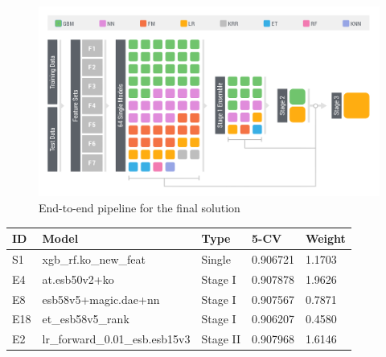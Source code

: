 \begin{figure}[!ht]
  \caption{End-to-end pipeline for the final solution}
  \centering
    \includegraphics[width=1 \textwidth]{ensemble}
\end{figure}

\begin{center}
\begin{tabular}{lllll}
\label{tb:finalEnsemble}
ID 	& Model 				& Type 	& 5-CV 		& Weight\\ \hline
S1 	& xgb\_rf.ko\_new\_feat 	& Single 	& 0.906721 	& 1.1703 \\
E4 	& at.esb50v2+ko 		& Stage I 	& 0.907878 	& 1.9626\\
E8 	& esb58v5+magic.dae+nn & Stage I & 0.907567	& 0.7871\\
E18	& et\_esb58v5\_rank		& Stage I	& 0.906207 	& 0.4580\\
E2	& lr\_forward\_0.01\_esb.esb15v3 & Stage II & 0.907968 & 1.6146\\
\end{tabular}
\end{center}

